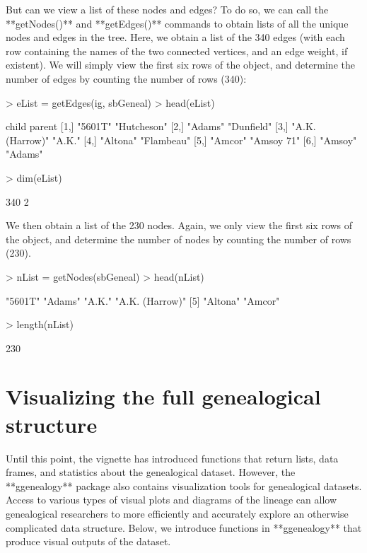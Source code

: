 \documentclass{article}
\numberwithin{equation}{section} %
\begin{document}
But can we view a list of these nodes and edges? To do so, we can call the **getNodes()** and **getEdges()** commands to obtain lists of all the unique nodes and edges in the tree. Here, we obtain a list of the 340 edges (with each row containing the names of the two connected vertices, and an edge weight, if existent). We will simply view the first six rows of the object, and determine the number of edges by counting the number of rows (340):

\begin{Schunk}
\begin{Sinput}
> eList = getEdges(ig, sbGeneal)
> head(eList)
\end{Sinput}
\begin{Soutput}
     child           parent     
[1,] "5601T"         "Hutcheson"
[2,] "Adams"         "Dunfield" 
[3,] "A.K. (Harrow)" "A.K."     
[4,] "Altona"        "Flambeau" 
[5,] "Amcor"         "Amsoy 71" 
[6,] "Amsoy"         "Adams"    
\end{Soutput}
\begin{Sinput}
> dim(eList)
\end{Sinput}
\begin{Soutput}
[1] 340   2
\end{Soutput}
\end{Schunk}

We then obtain a list of the 230 nodes. Again, we only view the first six rows of the object, and determine the number of nodes by counting the number of rows (230).

\begin{Schunk}
\begin{Sinput}
> nList = getNodes(sbGeneal)
> head(nList)
\end{Sinput}
\begin{Soutput}
[1] "5601T"         "Adams"         "A.K."          "A.K. (Harrow)"
[5] "Altona"        "Amcor"        
\end{Soutput}
\begin{Sinput}
> length(nList)
\end{Sinput}
\begin{Soutput}
[1] 230
\end{Soutput}
\end{Schunk}

\section{Visualizing the full genealogical structure}

Until this point, the vignette has introduced functions that return lists, data frames, and statistics about the genealogical dataset. However, the **ggenealogy** package also contains visualization tools for genealogical datasets. Access to various types of visual plots and diagrams of the lineage can allow genealogical researchers to more efficiently and accurately explore an otherwise complicated data structure. Below, we introduce functions in **ggenealogy** that produce visual outputs of the dataset.
\end{document}
